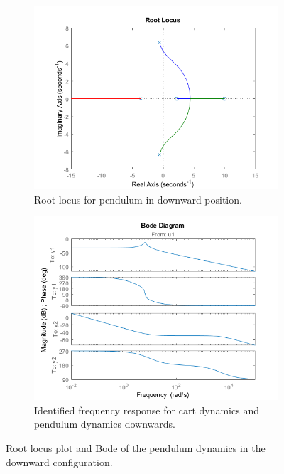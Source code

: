 \documentclass[12pt]{article}
\begin{document}
\begin{figure}[H]
    \centering
    \begin{subfigure}[b]{0.45\textwidth}
        \includegraphics[width=\textwidth]{../plots/rlocus_down.png}
        \caption{Root locus for pendulum in downward position.}
        \label{fig:rl_down}
    \end{subfigure}
    \hfill
    \begin{subfigure}[b]{0.45\textwidth}
        \includegraphics[width=\textwidth]{../plots/bode_down.png}
        \caption{Identified frequency response for cart dynamics and pendulum dynamics downwards.}
        \label{fig:bode_down}
    \end{subfigure}
    \caption{Root locus plot and Bode of the pendulum dynamics in the downward configuration.}
    \label{fig:rlocus_plots}
\end{figure}
\end{document}
